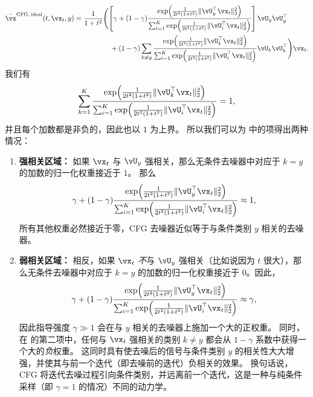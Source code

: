 \documentclass[../../book-main.tex]{subfiles}
\begin{document}
\begin{example}
\begin{equation}
    \begin{split}
      \bar{\vx}^{\mathrm{CFG,\,ideal}}(t, \vx_t, y)
      =
      \frac{1}{1 + t^{2}}
      &\Biggl(
      \left[\gamma + (1 - \gamma) 
      \frac{\exp\rp{\frac{1}{2t^{2}(1
      + t^{2})}\norm{\vU_{y}^{\top}\vx_t}_{2}^{2}}}{\sum_{i
      = 1}^{K}\exp\rp{\frac{1}{2t^{2}(1
      + t^{2})}\norm{\vU_{i}^{\top}\vx_t}_{2}^{2}}}
      \right]
      \vU_{y}\vU_{y}^{\top}
      \\
      &\quad+
      (1 - \gamma) 
      \sum_{k \neq y}\frac{\exp\rp{\frac{1}{2t^{2}(1
      + t^{2})}\norm{\vU_{k}^{\top}\vx_t}_{2}^{2}}}{\sum_{i
      = 1}^{K}\exp\rp{\frac{1}{2t^{2}(1
      + t^{2})}\norm{\vU_{i}^{\top}\vx_t}_{2}^{2}}}\vU_{k}\vU_{k}^{\top}
      \Biggr)
      \vx_t.
    \end{split}
  \end{equation}
  我们有
  \begin{equation}
    \sum_{k=1}^K
    \frac{\exp\rp{\frac{1}{2t^{2}(1
    + t^{2})}\norm{\vU_{k}^{\top}\vx_t}_{2}^{2}}}{\sum_{i
    = 1}^{K}\exp\rp{\frac{1}{2t^{2}(1
    + t^{2})}\norm{\vU_{i}^{\top}\vx_t}_{2}^{2}}}
    = 1,
  \end{equation}
  并且每个加数都是非负的，因此也以 $1$ 为上界。
  所以我们可以为  中的项得出两种情况：
  \begin{enumerate}
    \item \textbf{强相关区域：} 如果 $\vx_t$ 与 $\vU_y$ 强相关，那么无条件去噪器中对应于 $k=y$ 的加数的归一化权重接近于 $1$。
      那么
      \begin{equation}
        \gamma + (1 - \gamma) 
      \frac{\exp\rp{\frac{1}{2t^{2}(1
      + t^{2})}\norm{\vU_{y}^{\top}\vx_t}_{2}^{2}}}{\sum_{i
      = 1}^{K}\exp\rp{\frac{1}{2t^{2}(1
      + t^{2})}\norm{\vU_{i}^{\top}\vx_t}_{2}^{2}}}
        \approx 1,
      \end{equation}
      所有其他权重必然接近于零，CFG 去噪器近似等于与条件类别 $y$ 相关的去噪器。
    \item \textbf{弱相关区域：} 相反，如果 $\vx_t$ \textit{不}与 $\vU_y$ 强相关（比如说因为 $t$ 很大），那么无条件去噪器中对应于 $k=y$ 的加数的归一化权重接近于 $0$。因此，
      \begin{equation}
        \gamma + (1 - \gamma) 
      \frac{\exp\rp{\frac{1}{2t^{2}(1
      + t^{2})}\norm{\vU_{y}^{\top}\vx_t}_{2}^{2}}}{\sum_{i
      = 1}^{K}\exp\rp{\frac{1}{2t^{2}(1
      + t^{2})}\norm{\vU_{i}^{\top}\vx_t}_{2}^{2}}}
        \approx \gamma,
      \end{equation}
      因此指导强度 $\gamma \gg 1$ 会在与 $y$ 相关的去噪器上施加一个大的正权重。
      同时，在  的第二项中，任何与 $\vx_t$ 强相关的类别 $k \neq y$ 都会从 $1 - \gamma$ 系数中获得一个大的\textit{负}权重。
      这同时具有使去噪后的信号与条件类别 $y$ 的相关性大大增强，并使其与前一个迭代（即去噪前的迭代）负相关的效果。
      换句话说，CFG 将迭代去噪过程引向条件类别，并远离前一个迭代，这是一种与纯条件采样（即 $\gamma = 1$ 的情况）不同的动力学。
  \end{enumerate}


\end{example}
\end{document}
